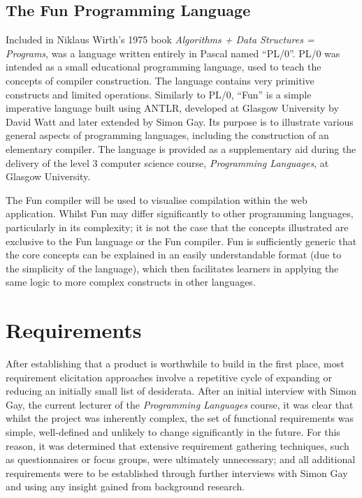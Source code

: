 \documentclass{l4proj}
\begin{document}
\section{The Fun Programming Language}
Included in Niklaus Wirth's 1975 book {\it Algorithms + Data Structures = Programs}, was a language written entirely in Pascal named ``PL/0''. PL/0 was intended as a small educational programming language, used to teach the concepts of compiler construction. The language contains very primitive constructs and limited operations. Similarly to PL/0, ``Fun'' is a simple imperative language built using ANTLR, developed at Glasgow University by David Watt and later extended by Simon Gay. Its purpose is to illustrate various general aspects of programming languages, including the construction of an elementary compiler. The language is provided as a supplementary aid during the delivery of the level 3 computer science course, {\it Programming Languages}, at Glasgow University.

The Fun compiler will be used to visualise compilation within the web application. Whilst Fun may differ significantly to other programming languages, particularly in its complexity; it is not the case that the concepts illustrated are exclusive to the Fun language or the Fun compiler. Fun is sufficiently generic that the core concepts can be explained in an easily understandable format (due to the simplicity of the language), which then facilitates learners in applying the same logic to more complex constructs in other languages.

\chapter{Requirements}
After establishing that a product is worthwhile to build in the first place, most requirement elicitation approaches involve a repetitive cycle of expanding or reducing an initially small list of desiderata. After an initial interview with Simon Gay, the current lecturer of the {\it Programming Languages} course, it was clear that whilst the project was inherently complex, the set of functional requirements was simple, well-defined and unlikely to change significantly in the future. For this reason, it was determined that extensive requirement gathering techniques, such as questionnaires or focus groups, were ultimately unnecessary; and all additional requirements were to be established through further interviews with Simon Gay and using any insight gained from background research.
\end{document}
